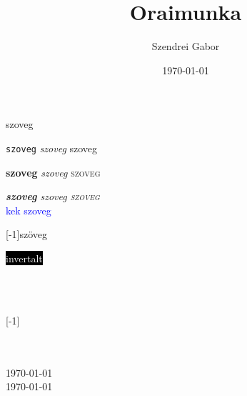 \documentclass{article}
\begin{document}
szoveg


\texttt{szoveg}
\textsl{szoveg}
\textsf{szoveg}

\textbf{szoveg}
\textit{szoveg}
\textsc{szoveg}

\emph{\textbf{szoveg}
\textit{szoveg}
\textsc{szoveg}}\\

\textcolor{blue}{kek szoveg} 




\scalebox{2}[-1]{szöveg}

\colorbox{black}{\textcolor{white}{invertalt}}

\\

\blindtext

\framebox{\parbox{5cm}{\blindtext}}\\
\scalebox{2}[-1]{\parbox{5cm}{\blindtext}}\\

\linespread{1.6}\selectfont
\raggedleft{\blindtext}\\
\today\\
\today\\

\title{Oraimunka}
\author{Szendrei Gabor}
\date{\today}
\maketitle
\blindtext
\end{document}
